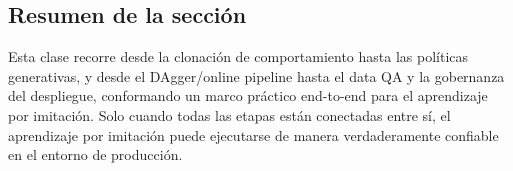 \subsection{Resumen de la sección}

Esta clase recorre desde la clonación de comportamiento hasta las políticas generativas, y desde el DAgger/online pipeline hasta el data QA y la gobernanza del despliegue, conformando un marco práctico end-to-end para el aprendizaje por imitación. Solo cuando todas las etapas están conectadas entre sí, el aprendizaje por imitación puede ejecutarse de manera verdaderamente confiable en el entorno de producción.


